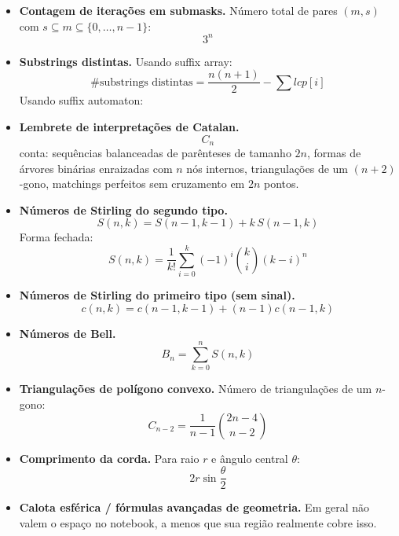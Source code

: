 \begin{itemize}[leftmargin=*,label={}]
  \ifextended
  \item \textbf{Contagem de itera\c{c}\~oes em submasks.}
  N\'umero total de pares $(m,s)$ com $s\subseteq m\subseteq \{0,\dots,n-1\}$:
  \[
    3^n
  \]
  \fi

  \item \textbf{Substrings distintas.}
  Usando suffix array:
  \[
    \#\text{substrings distintas}
    = \frac{n(n+1)}{2} - \sum lcp[i]
  \]
  Usando suffix automaton:
  \begin{center}
  \end{center}

  \ifextended
  \item \textbf{Lembrete de interpreta\c{c}\~oes de Catalan.}
  \[
    C_n
  \]
  conta:
  sequ\^encias balanceadas de par\^enteses de tamanho $2n$, formas de \'arvores bin\'arias enraizadas com $n$ n\'os internos, triangula\c{c}\~oes de um $(n+2)$-gono, matchings perfeitos sem cruzamento em $2n$ pontos.
  \fi
\end{itemize}

\ifextended

\begin{itemize}[leftmargin=*,label={}]
  \item \textbf{N\'umeros de Stirling do segundo tipo.}
  \[
    S(n,k)=S(n-1,k-1)+k\,S(n-1,k)
  \]
  Forma fechada:
  \[
    S(n,k)=\frac1{k!}\sum_{i=0}^{k}(-1)^i\binom{k}{i}(k-i)^n
  \]

  \item \textbf{N\'umeros de Stirling do primeiro tipo (sem sinal).}
  \[
    c(n,k)=c(n-1,k-1)+(n-1)c(n-1,k)
  \]

  \item \textbf{N\'umeros de Bell.}
  \[
    B_n=\sum_{k=0}^{n}S(n,k)
  \]

  \item \textbf{Triangula\c{c}\~oes de pol\'igono convexo.}
  N\'umero de triangula\c{c}\~oes de um $n$-gono:
  \[
    C_{n-2}=\frac{1}{n-1}\binom{2n-4}{n-2}
  \]

  \item \textbf{Comprimento da corda.}
  Para raio $r$ e \^angulo central $\theta$:
  \[
    2r\sin\frac{\theta}{2}
  \]

  \item \textbf{Calota esf\'erica / f\'ormulas avan\c{c}adas de geometria.}
  Em geral n\~ao valem o espa\c{c}o no notebook, a menos que sua regi\~ao realmente cobre isso.
\end{itemize}

\fi
